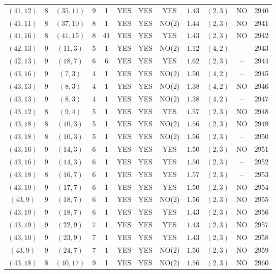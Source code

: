 \begin{longtable}{|c|c|c|c|c|c|c|c|c|c|c|c|}
$(41,12)$ & 8 & $(35,11)$ & 9 & 1 & YES & YES & YES & $1.43$ & $(2,3)$ & NO & 2940\\
$(41,11)$ & 8 & $(37,10)$ & 8 & 1 & YES & YES & NO(2) & $1.44$ & $(2,3)$ & NO & 2941\\
$(41,16)$ & 8 & $(41,15)$ & 8 & 41 & YES & YES & YES & $1.43$ & $(2,3)$ & NO & 2942\\
$(42,13)$ & 9 & $(11,3)$ & 5 & 1 & YES & YES & NO(2) & $1.12$ & $(4,2)$ & -- & 2943\\
$(42,13)$ & 9 & $(18,7)$ & 6 & 6 & YES & YES & YES & $1.62$ & $(2,3)$ & -- & 2944\\
$(43,16)$ & 9 & $(7,3)$ & 4 & 1 & YES & YES & NO(2) & $1.50$ & $(4,2)$ & -- & 2945\\
$(43,13)$ & 9 & $(8,3)$ & 4 & 1 & YES & YES & NO(2) & $1.38$ & $(4,2)$ & NO & 2946\\
$(43,13)$ & 9 & $(8,3)$ & 4 & 1 & YES & YES & NO(2) & $1.38$ & $(4,2)$ & -- & 2947\\
$(43,12)$ & 8 & $(9,4)$ & 5 & 1 & YES & YES & YES & $1.57$ & $(2,3)$ & NO & 2948\\
$(43,18)$ & 8 & $(10,3)$ & 5 & 1 & YES & YES & NO(2) & $1.56$ & $(2,3)$ & NO & 2949\\
$(43,18)$ & 8 & $(10,3)$ & 5 & 1 & YES & YES & NO(2) & $1.56$ & $(2,3)$ & -- & 2950\\
$(43,16)$ & 9 & $(14,3)$ & 6 & 1 & YES & YES & YES & $1.50$ & $(2,3)$ & NO & 2951\\
$(43,16)$ & 9 & $(14,3)$ & 6 & 1 & YES & YES & YES & $1.50$ & $(2,3)$ & -- & 2952\\
$(43,18)$ & 8 & $(16,7)$ & 6 & 1 & YES & YES & YES & $1.57$ & $(2,3)$ & -- & 2953\\
$(43,10)$ & 9 & $(17,7)$ & 6 & 1 & YES & YES & YES & $1.50$ & $(2,3)$ & NO & 2954\\
$(43,9)$ & 9 & $(18,7)$ & 6 & 1 & YES & YES & NO(2) & $1.56$ & $(2,3)$ & NO & 2955\\
$(43,19)$ & 9 & $(18,7)$ & 6 & 1 & YES & YES & YES & $1.43$ & $(2,3)$ & NO & 2956\\
$(43,19)$ & 9 & $(22,9)$ & 7 & 1 & YES & YES & YES & $1.43$ & $(2,3)$ & NO & 2957\\
$(43,10)$ & 9 & $(23,9)$ & 7 & 1 & YES & YES & YES & $1.43$ & $(2,3)$ & NO & 2958\\
$(43,9)$ & 9 & $(24,7)$ & 7 & 1 & YES & YES & NO(2) & $1.56$ & $(2,3)$ & NO & 2959\\
$(43,18)$ & 8 & $(40,17)$ & 9 & 1 & YES & YES & NO(2) & $1.56$ & $(2,3)$ & NO & 2960\\

\end{longtable}
